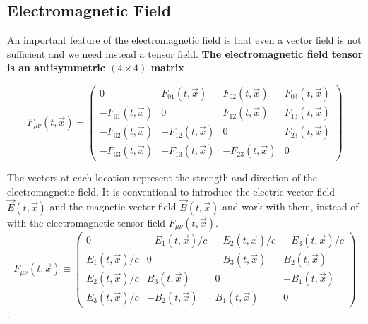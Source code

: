 \subsection{Electromagnetic Field}
An important feature of the electromagnetic field is that even a vector field is not sufficient and we need instead a tensor field. \textbf{The electromagnetic field tensor is an antisymmetric $(4 \times 4)$ matrix}
\begin{qt}
    \begin{equation}
F_{\mu \nu}(t, \vec{x})=\left(\begin{array}{cccc}
{0} & {F_{01}(t, \vec{x})} & {F_{02}(t, \vec{x})} & {F_{03}(t, \vec{x})} \\
{-F_{01}(t, \vec{x})} & {0} & {F_{12}(t, \vec{x})} & {F_{13}(t, \vec{x})} \\
{-F_{02}(t, \vec{x})} & {-F_{12}(t, \vec{x})} & {0} & {F_{23}(t, \vec{x})} \\
{-F_{03}(t, \vec{x})} & {-F_{13}(t, \vec{x})} & {-F_{23}(t, \vec{x})} & {0}
\end{array}\right)
\end{equation}
\end{qt}
The vectors at each location represent the strength and direction of the electromagnetic field. It is conventional to introduce the electric vector field $\vec{E}(t, \vec{x})$ and the magnetic vector field $\vec{B}(t, \vec{x})$ and work with them, instead of with the electromagnetic tensor field $F_{\mu \nu}(t, \vec{x})$.
\begin{equation}
F_{\mu \nu}(t, \vec{x})\equiv\left(\begin{array}{cccc}
{0} & {-E_{1}(t, \vec{x}) / c} & {-E_{2}(t, \vec{x}) / c} & {-E_{3}(t, \vec{x}) / c} \\
{E_{1}(t, \vec{x}) / c} & {0} & {-B_{3}(t, \vec{x})} & {B_{2}(t, \vec{x})} \\
{E_{2}(t, \vec{x}) / c} & {B_{3}(t, \vec{x})} & {0} & {-B_{1}(t, \vec{x})} \\
{E_{3}(t, \vec{x}) / c} & {-B_{2}(t, \vec{x})} & {B_{1}(t, \vec{x})} & {0}
\end{array}\right)
\end{equation}
.

